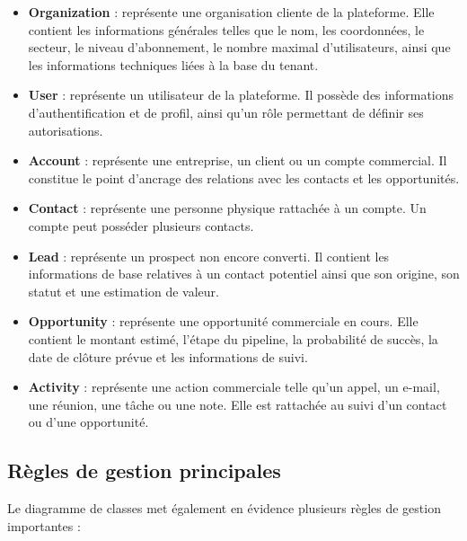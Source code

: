 \documentclass[12pt,a4paper,twoside,openany]{book}
\begin{document}
\begin{itemize}
    \item \textbf{Organization} : représente une organisation cliente de la plateforme. Elle contient les informations générales telles que le nom, les coordonnées, le secteur, le niveau d’abonnement, le nombre maximal d’utilisateurs, ainsi que les informations techniques liées à la base du tenant.
    
    \item \textbf{User} : représente un utilisateur de la plateforme. Il possède des informations d’authentification et de profil, ainsi qu’un rôle permettant de définir ses autorisations.
    
    \item \textbf{Account} : représente une entreprise, un client ou un compte commercial. Il constitue le point d’ancrage des relations avec les contacts et les opportunités.
    
    \item \textbf{Contact} : représente une personne physique rattachée à un compte. Un compte peut posséder plusieurs contacts.
    
    \item \textbf{Lead} : représente un prospect non encore converti. Il contient les informations de base relatives à un contact potentiel ainsi que son origine, son statut et une estimation de valeur.
    
    \item \textbf{Opportunity} : représente une opportunité commerciale en cours. Elle contient le montant estimé, l’étape du pipeline, la probabilité de succès, la date de clôture prévue et les informations de suivi.
    
    \item \textbf{Activity} : représente une action commerciale telle qu’un appel, un e-mail, une réunion, une tâche ou une note. Elle est rattachée au suivi d’un contact ou d’une opportunité.
\end{itemize}

\subsection{Règles de gestion principales}

Le diagramme de classes met également en évidence plusieurs règles de gestion importantes :
\end{document}
